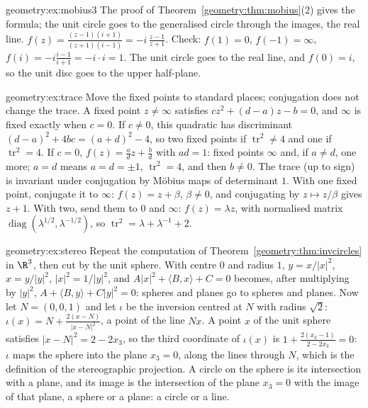 \begin{solution}{geometry:ex:mobius3}
\idea The proof of Theorem~\ref{geometry:thm:mobius}(2) gives the formula; the unit circle goes to the generalised circle through the images, the real line.
\writeup $f(z)=\frac{(z-1)(i+1)}{(z+1)(i-1)}=-i\,\frac{z-1}{z+1}$. Check: $f(1)=0$, $f(-1)=\infty$, $f(i)=-i\frac{i-1}{i+1}=-i\cdot i=1$. The unit circle goes
to the real line, and $f(0)=i$, so the unit disc goes to the upper half-plane.
\end{solution}

\begin{solution}{geometry:ex:trace}
\idea Move the fixed points to standard places; conjugation does not change the trace.
\writeup A fixed point $z\ne\infty$ satisfies $cz^2+(d-a)z-b=0$, and $\infty$ is fixed exactly when $c=0$. If $c\ne0$, this quadratic has
discriminant $(d-a)^2+4bc=(a+d)^2-4$, so two fixed points if $\operatorname{tr}^2\ne4$ and one if $\operatorname{tr}^2=4$. If $c=0$, $f(z)=\frac adz+\frac bd$ with
$ad=1$: fixed points $\infty$ and, if $a\ne d$, one more; $a=d$ means $a=d=\pm1$, $\operatorname{tr}^2=4$, and then $b\ne0$. The trace (up to sign) is
invariant under conjugation by M\"obius maps of determinant $1$. With one fixed point, conjugate it to $\infty$: $f(z)=z+\beta$, $\beta\ne0$, and
conjugating by $z\mapsto z/\beta$ gives $z+1$. With two, send them to $0$ and $\infty$: $f(z)=\lambda z$, with normalised matrix
$\operatorname{diag}(\lambda^{1/2},\lambda^{-1/2})$, so $\operatorname{tr}^2=\lambda+\lambda^{-1}+2$.
\end{solution}

\begin{solution}{geometry:ex:stereo}
\idea Repeat the computation of Theorem~\ref{geometry:thm:invcircles} in $\R^3$, then cut by the unit sphere.
\writeup With centre $0$ and radius $1$, $y=x/|x|^2$, $x=y/|y|^2$, $|x|^2=1/|y|^2$, and $A|x|^2+\langle B,x\rangle+C=0$ becomes, after multiplying by $|y|^2$,
$A+\langle B,y\rangle+C|y|^2=0$: spheres and planes go to spheres and planes. Now let $N=(0,0,1)$ and let $\iota$ be the inversion centred at $N$ with
radius $\sqrt2$: $\iota(x)=N+\frac{2(x-N)}{|x-N|^2}$, a point of the line $Nx$. A point $x$ of the unit sphere satisfies $|x-N|^2=2-2x_3$, so the
third coordinate of $\iota(x)$ is $1+\frac{2(x_3-1)}{2-2x_3}=0$: $\iota$ maps the sphere into the plane $x_3=0$, along the lines through $N$, which is
the definition of the stereographic projection. A
circle on the sphere is its intersection with a plane, and its image is the intersection of the plane $x_3=0$ with the image of that plane, a sphere
or a plane: a circle or a line.
\end{solution}

